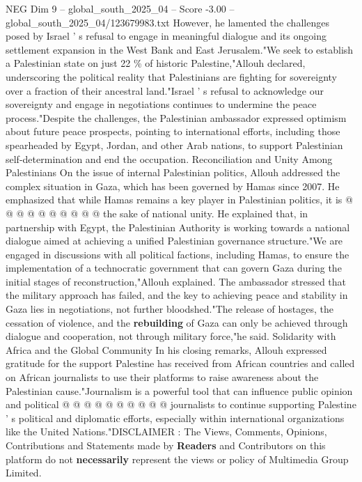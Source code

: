 \begin{textsample}{NEG Dim 9 – global\_south\_2025\_04 – Score -3.00 – global\_south\_2025\_04/123679983.txt}
However, he lamented the challenges posed by Israel ' s refusal to engage in meaningful dialogue and its ongoing settlement expansion in the West Bank and East Jerusalem."We seek to establish a Palestinian state on just 22 \% of historic Palestine,"Allouh declared, underscoring the political reality that Palestinians are fighting for sovereignty over a fraction of their ancestral land."Israel ' s refusal to acknowledge our sovereignty and engage in negotiations continues to undermine the peace process."Despite the challenges, the Palestinian ambassador expressed optimism about future peace prospects, pointing to international efforts, including those spearheaded by Egypt, Jordan, and other Arab nations, to support Palestinian self-determination and end the occupation.
Reconciliation and Unity Among Palestinians On the issue of internal Palestinian politics, Allouh addressed the complex situation in Gaza, which has been governed by Hamas since 2007.
He emphasized that while Hamas remains a key player in Palestinian politics, it is @ @ @ @ @ @ @ @ @ @ the sake of national unity.
He explained that, in partnership with Egypt, the Palestinian Authority is working towards a national dialogue aimed at achieving a unified Palestinian governance structure."We are engaged in discussions with all political factions, including Hamas, to ensure the implementation of a technocratic government that can govern Gaza during the initial stages of reconstruction,"Allouh explained.
The ambassador stressed that the military approach has failed, and the key to achieving peace and stability in Gaza lies in negotiations, not further bloodshed."The release of hostages, the cessation of violence, and the \textbf{rebuilding} of Gaza can only be achieved through dialogue and cooperation, not through military force,"he said.
Solidarity with Africa and the Global Community In his closing remarks, Allouh expressed gratitude for the support Palestine has received from African countries and called on African journalists to use their platforms to raise awareness about the Palestinian cause."Journalism is a powerful tool that can influence public opinion and political @ @ @ @ @ @ @ @ @ @ journalists to continue supporting Palestine ' s political and diplomatic efforts, especially within international organizations like the United Nations."DISCLAIMER : The Views, Comments, Opinions, Contributions and Statements made by \textbf{Readers} and Contributors on this platform do not \textbf{necessarily} represent the views or policy of Multimedia Group Limited.

\end{textsample}
